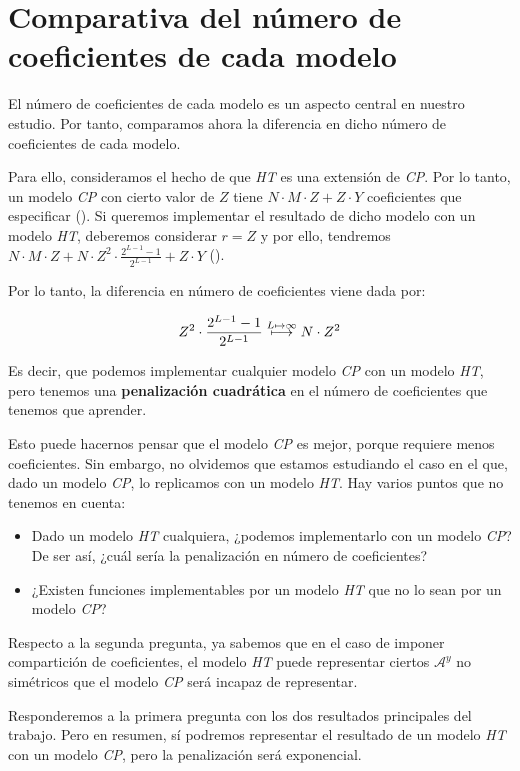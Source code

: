 \section{Comparativa del número de coeficientes de cada modelo}

El número de coeficientes de cada modelo es un aspecto central en nuestro estudio. Por tanto, comparamos ahora la diferencia en dicho número de coeficientes de cada modelo.

Para ello, consideramos el hecho de que \textit{HT} es una extensión de \textit{CP}. Por lo tanto, un modelo \textit{CP} con cierto valor de $Z$ tiene  $N \cdot M \cdot Z + Z \cdot Y$ coeficientes que especificar (). Si queremos implementar el resultado de dicho modelo con un modelo \textit{HT}, deberemos considerar $r = Z$ y por ello, tendremos $N \cdot M \cdot Z + N \cdot Z^2 \cdot \frac{2^{L-1} - 1}{2^{L-1}} + Z \cdot Y$ ().

Por lo tanto, la diferencia en número de coeficientes viene dada por:

\begin{equation}
    Z^2 \cdot \frac{2^{L-1} - 1}{2^{L-1}} \stackrel{L \mapsto \infty}{\longmapsto} N \cdot Z^2
\end{equation}

Es decir, que podemos implementar cualquier modelo \textit{CP} con un modelo \textit{HT}, pero tenemos una \textbf{penalización cuadrática} en el número de coeficientes que tenemos que aprender.

Esto puede hacernos pensar que el modelo \textit{CP} es mejor, porque requiere menos coeficientes. Sin embargo, no olvidemos que estamos estudiando el caso en el que, dado un modelo \textit{CP}, lo replicamos con un modelo \textit{HT}. Hay varios puntos
que no tenemos en cuenta:

\begin{itemize}
    \item Dado un modelo \textit{HT} cualquiera, ¿podemos implementarlo con un modelo \textit{CP}? De ser así, ¿cuál sería la penalización en número de coeficientes?
    \item ¿Existen funciones implementables por un modelo \textit{HT} que no lo sean por un modelo \textit{CP}?
\end{itemize}

Respecto a la segunda pregunta, ya sabemos que en el caso de imponer compartición de coeficientes, el modelo \textit{HT} puede representar ciertos $\mathcal{A}^y$ no simétricos que el modelo \textit{CP} será incapaz de representar.

Responderemos a la primera pregunta con los dos resultados principales del trabajo. Pero en resumen, sí podremos representar el resultado de un modelo \textit{HT} con un modelo \textit{CP}, pero la penalización será exponencial.
